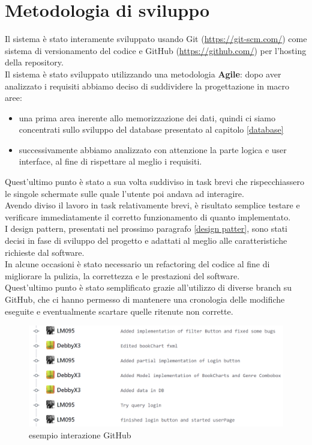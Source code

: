 \documentclass[a4paper,11pt]{report}
\begin{document}
\section{Metodologia di sviluppo}
Il sistema è stato interamente sviluppato usando Git (\url{https://git-scm.com/}) come sistema di versionamento del codice e GitHub (\url{https://github.com/}) per l'hosting della repository.\\
Il sistema è stato sviluppato utilizzando una metodologia \textbf{Agile}: dopo aver analizzato i requisiti abbiamo deciso di suddividere la progettazione in macro aree: 
\begin{itemize}
    \item una prima area inerente allo memorizzazione dei dati, quindi ci siamo concentrati sullo sviluppo del database presentato al capitolo \ref{database}
    \item successivamente abbiamo analizzato con attenzione la parte logica e user interface, al fine di rispettare al meglio i requisiti.
\end{itemize} 
Quest'ultimo punto è stato a sua volta suddiviso in task brevi che rispecchiassero le singole schermate sulle quale l'utente poi andava ad interagire.\\ Avendo diviso il lavoro in task relativamente brevi, è risultato semplice testare e verificare immediatamente il corretto funzionamento di quanto implementato. \\
\newline 
I design pattern, presentati nel prossimo paragrafo \ref{design patter}, sono stati decisi in fase di sviluppo del progetto e adattati al meglio alle caratteristiche richieste dal software.\\ 
In alcune occasioni è stato necessario un refactoring del codice al fine di migliorare la pulizia, la correttezza e le prestazioni del software. \\
Quest'ultimo punto è stato semplificato grazie all'utilizzo di diverse branch su GitHub, che ci hanno permesso di mantenere una cronologia delle modifiche eseguite e eventualmente scartare quelle ritenute non corrette.\\
\begin{figure}[h!]
    	\centering
    	\hspace*{-0.5in}
    	\includegraphics[width=0.8\linewidth]{Other/esGitHub.PNG}
    	\caption{esempio interazione GitHub}
    \end{figure}\\
\end{document}
